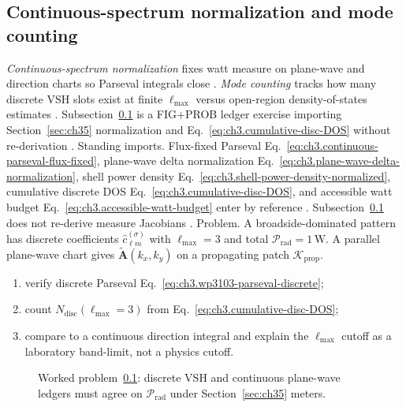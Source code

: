 \subsection{Continuous-spectrum normalization and mode counting}
\label{sec:ch3103}
\emph{Continuous-spectrum normalization} fixes watt measure on plane-wave and direction charts so Parseval integrals close
\cite{stratton1941}. \emph{Mode counting} tracks how many discrete VSH slots exist at finite \(\ell_{\max}\) versus
open-region density-of-states estimates \cite{hansen1988}. Subsection~\ref{sec:ch3103} is a FIG+PROB ledger exercise importing
Section~\ref{sec:ch35} normalization and Eq.~\eqref{eq:ch3.cumulative-disc-DOS} without re-derivation \cite{stratton1941}.
Standing imports. Flux-fixed Parseval Eq.~\eqref{eq:ch3.continuous-parseval-flux-fixed}, plane-wave delta normalization
Eq.~\eqref{eq:ch3.plane-wave-delta-normalization}, shell power density Eq.~\eqref{eq:ch3.shell-power-density-normalized},
cumulative discrete DOS Eq.~\eqref{eq:ch3.cumulative-disc-DOS}, and accessible watt budget Eq.~\eqref{eq:ch3.accessible-watt-budget} enter by
reference \cite{harrington2001}. Subsection~\ref{sec:ch3103} does not re-derive measure Jacobians
\cite{stratton1941}.
Problem. A broadside-dominated pattern has discrete coefficients \(\widehat{c}_{\ell m}^{(\sigma)}\) with \(\ell_{\max}=3\) and total
\(\mathcal{P}_{\mathrm{rad}}=1\,\mathrm{W}\). A parallel plane-wave chart gives \(\widetilde{\mathbf{A}}(k_{x},k_{y})\) on a propagating
patch \(\mathcal{K}_{\mathrm{prop}}\).
\begin{enumerate}
\item[(a)] verify discrete Parseval Eq.~\eqref{eq:ch3.wp3103-parseval-discrete};
\item[(b)] count \(N_{\mathrm{disc}}(\ell_{\max}=3)\) from Eq.~\eqref{eq:ch3.cumulative-disc-DOS};
\item[(c)] compare to a continuous direction integral and explain the \(\ell_{\max}\) cutoff as a laboratory band-limit, not a physics cutoff.
\end{enumerate}
\begin{figure}[t]
\centering
{}
\caption{Worked problem~\ref{sec:ch3103}: discrete VSH and continuous plane-wave ledgers must agree on \(\mathcal{P}_{\mathrm{rad}}\) under Section~\ref{sec:ch35} meters.}
\label{fig:ch3.3103-spectrum-ledger}
\end{figure}
